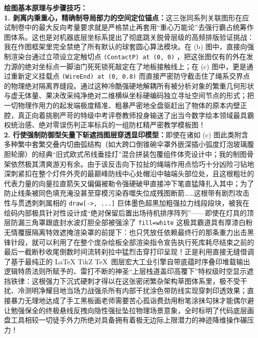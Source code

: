 \vspace{0.6cm}

{\small\color{blue!70!black}
\textbf{绘图基本原理与步骤技巧：}\\
\textbf{1. 剥离内秉重心，精确制导局部力的空间定位锚点：}这三张同系列关联图形在应试制卷中的最大反向考量要求就是严格禁止再套用“重心万能论”去强行霸占统筹作图体系。这也是对机器底层坐标系提出了彻底跳关脱骨层级的高频排版验证挑战：我在作图框架里完全禁绝了所有默认的球套圆心算法模块。在 (b) 图中，直接向强制渲染台通过立项设立定触切点 \texttt{(ContactP) at (0, 0)} ，把这张图仅有的外在发力源的绝对坐标点一脚油门死死锁死敲定在了地板接触线上；在 (c) 图中，更是通过重新定义挂载点 \texttt{(WireEnd) at (0, 0.8)} 而直接严密防守截击住了绳系交界点的物理绝对隔离界缝段。通过这种冷酷强硬地解耦所有被分析对象的繁重几何形状与虚无体量、果决改采纯净绝对二维横纵坐标硬编码独立寻址空间节点的形式；把一切物理作用力的起发端极度精准、粗暴严密地全盘驱赶出了物体的原本内壁正腔，真正向着挑剔严苛的特级中考评卷教师投身输送了出当今数字绘本领域最具霸权统治感、绝对零误伤判正率标兵的一组防杠精严密教学模板图！\\
\textbf{2. 行使强制防御型矢量下斩遮挡图层穿透显印模型：}即使在诸如 (c) 图此类附含多种繁中套繁交叠内切曲弧结构（如大跨口倒锥碗伞罩外嵌深插小弧度灯泡玻璃腹胆轮廓）的经典“旧式欧式吊线垂挂灯”混合拼装包覆组件体壳设计中；我的制图骨架依然极其清爽游刃有余。由于该反击向下拉扯的绳端作用点恰巧十分凶险刁钻地深刺紧扣在整个灯件外壳的最巅峰防线中心处帽沿中轴端头部位处，且这根粗壮的代表力量的向量拉直箭矢又偏偏被勒令强硬破甲直接冲下笔直猛降扎入其中；为了防止线条被同色填充淹没甚至穿模污染吞噬失位成残图断箭……这根带有剧烈攻击性与贯透刺刺属相的 \texttt{draw[->, ...]} 巨体墨色超黑加粗强拉力线段段块，被我在绘码内部极具针对性设计成“绝对保留后置出场待机排序阵列”——即使在灯具的顶层防漏三角罩跟底封水波灯胆全部被强涂了 \texttt{fill=white} 这极其霸道具有厚漆白粉无情覆膜隔离特效遮掩渲染罩的前提下：也只凭放任依赖最终行的那条重力出击黑锋针段，就可以利用了在整个庞杂绘板全部渲染指令宣告执行死库耗尽结束之前的最后一截断秒收尾倒数时间流转刹拉中猛烈击穿打印呈现！正是利用直接无缝借调了基于最纯正的 LaTeX TikZ \TeX\ 图层宏大工业引擎自带底蕴时序叠印堆载输出逻辑特质法则所赋予的、雷打不断的神圣“上层栈道盖印高覆下”特权级时空显示遮挡铁律：这根强力下沉式硬刺才得以在这张密闭繁杂架构草图体系里，极不受干扰、冷测明净耀目地当场力战强杀所有内部干扰涂色带防线实现穿刺印透效果；直接暴力无理地达成了手工黑板画老师需要苦心孤诣费劲用粉笔涂抹勾抹才能偶尔避让勉强保全的终极悬线反拽向隐性强扯坠拉物理场景意象，全时标明了代码底层画盘工具相较一切徒手外力所绝对具备拥有着极无边际上限潜力的神迹降维操作碾压力！
}

